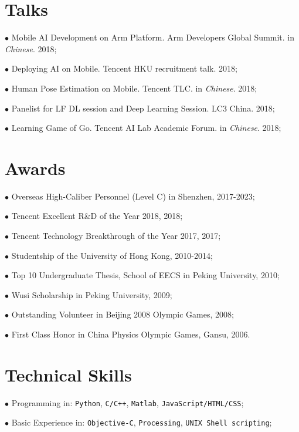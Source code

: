 \documentclass[10pt]{article}
\renewcommand{\section}[2]%
        {\pagebreak[2]\vspace{1.3\baselineskip}%
         \phantomsection\addcontentsline{toc}{section}{#1}%
         \hspace{0in}%
         \marginpar{
         \raggedright \scshape #1}#2}
\begin{document}

\section{Talks}
$\bullet$ Mobile AI Development on Arm Platform. Arm Developers Global Summit. in \textit{Chinese}. 2018;

$\bullet$ Deploying AI on Mobile. Tencent HKU recruitment talk. 2018;

$\bullet$ Human Pose Estimation on Mobile. Tencent TLC. in \textit{Chinese}. 2018;

$\bullet$ Panelist for LF DL session and Deep Learning Session. LC3 China. 2018;

$\bullet$ Learning Game of Go. Tencent AI Lab Academic Forum. in \textit{Chinese}. 2018;


\section{Awards}
$\bullet$ Overseas High-Caliber Personnel (Level C) in Shenzhen, 2017-2023;

$\bullet$ Tencent Excellent R\&D of the Year 2018, 2018;

$\bullet$ Tencent Technology Breakthrough of the Year 2017, 2017;

$\bullet$ Studentship of the University of Hong Kong, 2010-2014;

$\bullet$ Top 10 Undergraduate Thesis, School of EECS in Peking University, 2010;

$\bullet$ Wusi Scholarship in Peking University, 2009;

$\bullet$ Outstanding Volunteer in Beijing 2008 Olympic Games, 2008;

$\bullet$ First Class Honor in China Physics Olympic Games, Gansu, 2006.


\section{Technical Skills}
$\bullet$ Programming in: \texttt{Python}, \texttt{C/C++}, \texttt{Matlab}, \texttt{JavaScript/HTML/CSS};

$\bullet$ Basic Experience in: \texttt{Objective-C}, \texttt{Processing}, \texttt{UNIX Shell scripting};
\end{document}
